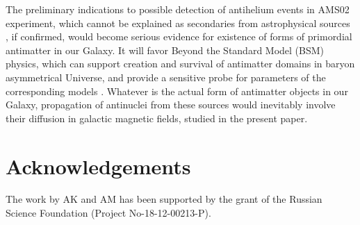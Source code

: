 \documentclass{article}
\begin{document}
The preliminary indications to possible detection of antihelium events in AMS02 experiment, which cannot be explained as secondaries from astrophysical sources \cite{poulin}, if confirmed, would become serious evidence for existence of forms of primordial antimatter in our Galaxy. It will favor Beyond the Standard Model (BSM) physics, which can support creation and survival of antimatter domains in baryon asymmetrical Universe, and provide a sensitive probe for parameters of the corresponding models \cite{PPNP}. Whatever is the actual form of antimatter objects in our Galaxy, propagation of antinuclei from these sources would inevitably involve their diffusion in galactic magnetic fields, studied in the present paper.
\section*{Acknowledgements}
The work by AK and AM has been supported by the grant of the Russian Science Foundation (Project No-18-12-00213-P). 
\end{document}
